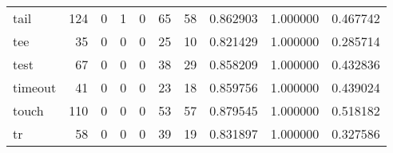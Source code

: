 \begin{longtable}{lrrrrrrrrr}
tail      &                                       124 &                                                  0 &                                                  1 &                                                  0 &                                                 65 &                                                 58 &                                           0.862903 &                               1.000000 &                             0.467742 \\
tee       &                                        35 &                                                  0 &                                                  0 &                                                  0 &                                                 25 &                                                 10 &                                           0.821429 &                               1.000000 &                             0.285714 \\
test      &                                        67 &                                                  0 &                                                  0 &                                                  0 &                                                 38 &                                                 29 &                                           0.858209 &                               1.000000 &                             0.432836 \\
timeout   &                                        41 &                                                  0 &                                                  0 &                                                  0 &                                                 23 &                                                 18 &                                           0.859756 &                               1.000000 &                             0.439024 \\
touch     &                                       110 &                                                  0 &                                                  0 &                                                  0 &                                                 53 &                                                 57 &                                           0.879545 &                               1.000000 &                             0.518182 \\
tr        &                                        58 &                                                  0 &                                                  0 &                                                  0 &                                                 39 &                                                 19 &                                           0.831897 &                               1.000000 &                             0.327586 \\

\end{longtable}
